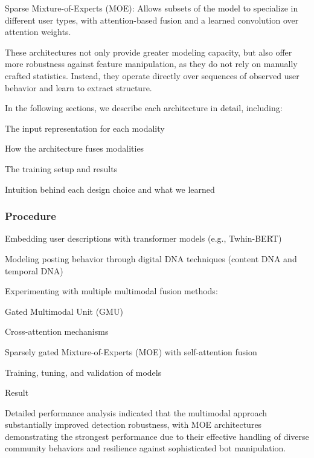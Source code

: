 \documentclass[conference]{IEEEtran}
\begin{document}
Sparse Mixture-of-Experts (MOE): Allows subsets of the model to specialize in different user types, with attention-based fusion and a learned convolution over attention weights.

These architectures not only provide greater modeling capacity, but also offer more robustness against feature manipulation, as they do not rely on manually crafted statistics. Instead, they operate directly over sequences of observed user behavior and learn to extract structure.

In the following sections, we describe each architecture in detail, including:

The input representation for each modality

How the architecture fuses modalities

The training setup and results

Intuition behind each design choice and what we learned

\subsubsection{Procedure}

Embedding user descriptions with transformer models (e.g., Twhin-BERT)

Modeling posting behavior through digital DNA techniques (content DNA and temporal DNA)

Experimenting with multiple multimodal fusion methods:

Gated Multimodal Unit (GMU)

Cross-attention mechanisms

Sparsely gated Mixture-of-Experts (MOE) with self-attention fusion

Training, tuning, and validation of models

Result

Detailed performance analysis indicated that the multimodal approach substantially improved detection robustness, with MOE architectures demonstrating the strongest performance due to their effective handling of diverse community behaviors and resilience against sophisticated bot manipulation.

\end{document}
